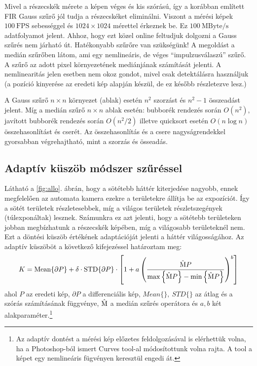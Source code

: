 	Mivel a részecskék mérete a képen véges és kis szórású, így a korábban
	említett FIR Gauss szűrő jól tudja a részecskéket eliminálni.
	Viszont a mérési képek $100\ \mathrm{FPS}$ sebességgel és $1024\times1024$ mérettel érkeznek be.
	Ez $100\ \mathrm{MByte/s}$ adatfolyamot jelent. Ahhoz, hogy ezt közel online feltudjuk dolgozni a
	Gauss szűrés nem járható út. Hatékonyabb szűrőre van szükségünk! A megoldást a medián szűrőben látom,
	ami egy nemlineáris, de véges ``impulzusválaszú'' szűrő.
	A szűrő az adott pixel környezetének mediánjának számítását jelenti.
	A nemlinearitás jelen esetben nem okoz gondot, mivel csak detektálásra használjuk (a pozíció
	kinyerése az eredeti kép alapján készül, de ez később részletezve lesz.)
	
	A Gauss szűrő $n\times n$ környezet (ablak) esetén $n^2$ szorzást és $n^2-1$ összeadást jelent. Míg
	a medián szűrő $n\times n$ ablak esetén: bubborék rendezés során $O(n^2)$, javított bubborék
	rendezés során $O(n^2 / 2)$ illetve quicksort esetén $O(n\log n)$ összehasonlítást és
	cserét. Az összehasonlítás és a csere nagyságrendekkel gyorsabban végrehajtható, mint a szorzás és
	össeadás.
	
\subsection{Adaptív küszöb módszer szűréssel}
	Látható a \ref{fig:allo}. ábrán, hogy a sötétebb háttér kiterjedése nagyobb, ennek megfelelően az
	automata kamera ezekre a területekre állítja be az expozíciót.
	Így a sötét területek részletesebbek, míg a világos területek részletszegények (túlexponáltak) lesznek.
	Számunkra ez azt jelenti, hogy a sötétebb területeken jobban megbízhatunk a részecskék képében,
	míg a világosabb területeknél nem.
	Ezt a döntési küszöb értékének adaptációját jelenti a háttér világosságához.
	Az adaptív küszöböt a következő kifejezéssel határoztam meg:
	\begin{align} 
		\label{eq:treshold}
		K = \mathrm{Mean}\{\partial P\} + \delta \cdot \mathrm{STD}\{\partial P\} \cdot 
		\left[ 1+ a \left(
			\frac{\mathrm{\hat{M}}P}{\max\left\{\mathrm{\hat{M}}P\right\} - \min\left\{\mathrm{\hat{M}}P\right\}}
			\right)^b
		\right]
	\end{align} 
	ahol $P$ az eredeti kép, $\partial P$ a differenciális kép, $Mean\{\},\ STD\{\}$ az átlag és a
	szórás számításának függvénye, $\mathrm{\hat{M}}$ a medián szűrés operátora és $a,b$ két
	alakparaméter.\footnote{Az adaptív dontést a mérési kép előzetes feldolgozásával is elérhettük
	volna, ha a Photoshop-ból ismert Curves tool-al módosítottunk volna rajta.
	A tool a képet egy nemlineáris fügvényen keresztül engedi át.}
	
